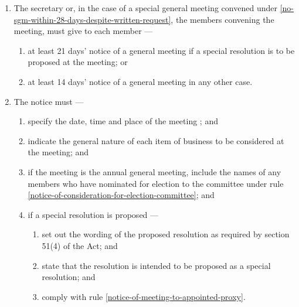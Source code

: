 \documentclass[../constitution.tex]{subfiles}
\begin{document}
\begin{enumerate}

\item The secretary or, in the case of a special general meeting convened under  \ref{no-sgm-within-28-days-despite-written-request}, the members convening the meeting, must give to each member ---

  \begin{enumerate}
  
  \item at least 21 days' notice of a general meeting if a special resolution is to be proposed at the meeting; or
  \item at least 14 days' notice of a general meeting in any other case.
  \end{enumerate}
\item The notice must ---

  \begin{enumerate}
  
  \item specify the date, time and place of the meeting  ; and
  \item indicate the general nature of each item of business to be considered at the meeting; and
  \item if the meeting is the annual general meeting, include the names of any members who have nominated for election to the committee under rule \ref{notice-of-consideration-for-election-committee}; and
  \item if a special resolution is proposed ---

    \begin{enumerate}
    
    \item set out the wording of the proposed resolution as required by section 51(4) of the Act; and
    \item state that the resolution is intended to be proposed as a special resolution; and
    \item comply with rule \ref{notice-of-meeting-to-appointed-proxy}.
    \end{enumerate}
  \end{enumerate}


\end{enumerate}
\end{document}
